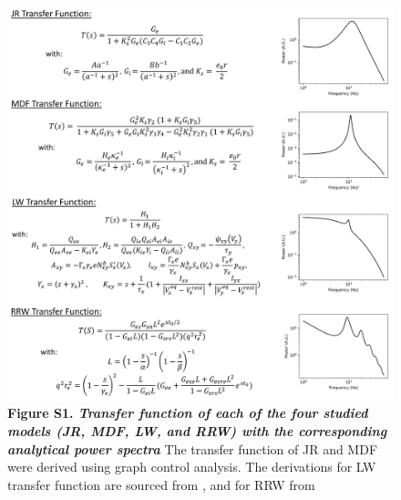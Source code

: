 \documentclass[12pt,twoside]{article}
\begin{document}
\begin{figure}[H]
    \centering
    \includegraphics[scale=0.45]{Images/Supp_transfer_v1.png}
    \caption*{\textbf{Figure S1.  \textit{Transfer function of each of the four studied models (JR, MDF, LW, and RRW) with the corresponding analytical power spectra}} The transfer function of JR and MDF were derived using graph control analysis. The derivations for LW transfer function are sourced from \citet{hartoyo2019parameter}, and for RRW from \citet{robinson2002dynamics}}     
    \label{fig:TF_supp}
\end{figure}
\end{document}

